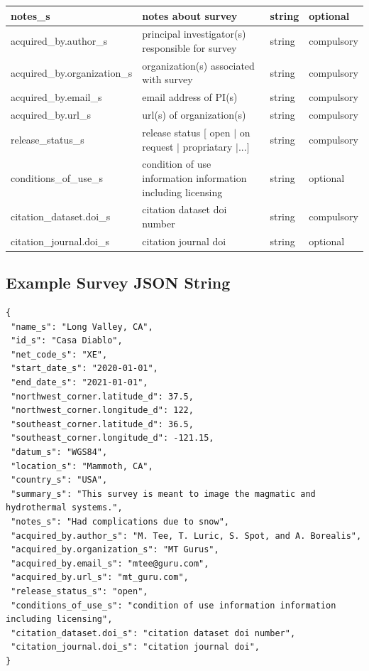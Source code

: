 \documentclass{article}
\begin{document}
\begin{table}[htb!]
\begin{tabular}{|l|l|l|l|}
		notes\_s & notes about survey & string & optional \\ \hline
		acquired\_by.author\_s & principal investigator(s) responsible for survey & string & compulsory \\ \hline
		acquired\_by.organization\_s & organization(s) associated with survey & string & compulsory \\ \hline
		acquired\_by.email\_s & email address of PI(s) & string & compulsory \\ \hline
		acquired\_by.url\_s & url(s) of organization(s) & string & compulsory \\ \hline
		release\_status\_s & release status [ open $|$ on request $|$ propriatary $|$...] & string & compulsory \\ \hline
		conditions\_of\_use\_s & condition of use information information including licensing & string & optional \\ \hline
		citation\_dataset.doi\_s & citation dataset doi number & string & compulsory \\ \hline
		citation\_journal.doi\_s & citation journal doi & string & optional \\ \hline
	\end{tabular}
	\label{tab:survey}
\end{table} 

\newpage
\subsection{Example Survey JSON String}

\begin{verbatim}
{
 "name_s": "Long Valley, CA",
 "id_s": "Casa Diablo",
 "net_code_s": "XE",
 "start_date_s": "2020-01-01",
 "end_date_s": "2021-01-01",
 "northwest_corner.latitude_d": 37.5,
 "northwest_corner.longitude_d": 122,
 "southeast_corner.latitude_d": 36.5,
 "southeast_corner.longitude_d": -121.15,
 "datum_s": "WGS84",
 "location_s": "Mammoth, CA",
 "country_s": "USA",
 "summary_s": "This survey is meant to image the magmatic and hydrothermal systems.",
 "notes_s": "Had complications due to snow",
 "acquired_by.author_s": "M. Tee, T. Luric, S. Spot, and A. Borealis",
 "acquired_by.organization_s": "MT Gurus",
 "acquired_by.email_s": "mtee@guru.com",
 "acquired_by.url_s": "mt_guru.com",
 "release_status_s": "open",
 "conditions_of_use_s": "condition of use information information including licensing",
 "citation_dataset.doi_s": "citation dataset doi number",
 "citation_journal.doi_s": "citation journal doi",
}
\end{verbatim}
\end{document}
